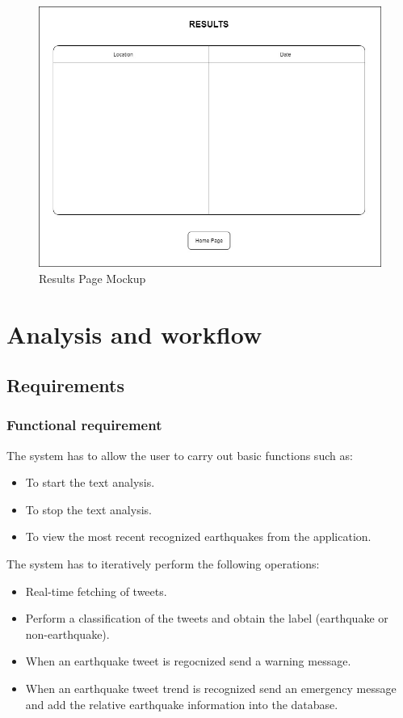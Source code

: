 \documentclass[a4paper, oneside]{article}
\begin{document}
\begin{figure}[h]
\centering
\includegraphics[width=\textwidth]{./images/diagrams/Charts} 
\caption{Results Page Mockup}
\label{fig:mockup}
\end{figure}

\clearpage

\section{Analysis and workflow}

\subsection{Requirements}

\subsubsection{Functional requirement}
The system has to allow the user to carry out basic functions such as:
\begin{itemize}
\item To start the text analysis.
\item To stop the text analysis.
\item To view the most recent recognized earthquakes from the application.
\end{itemize}
\vspace{2mm}
The system has to iteratively perform the following operations: 
\begin{itemize}
\item Real-time fetching of tweets.
\item Perform a classification of the tweets and obtain the label (earthquake or non-earthquake).
\item When an earthquake tweet is regocnized send a warning message.
\item When an earthquake tweet trend is recognized send an emergency message and add the relative earthquake information into the database.
\end{itemize}
\vspace{2mm}
\end{document}
